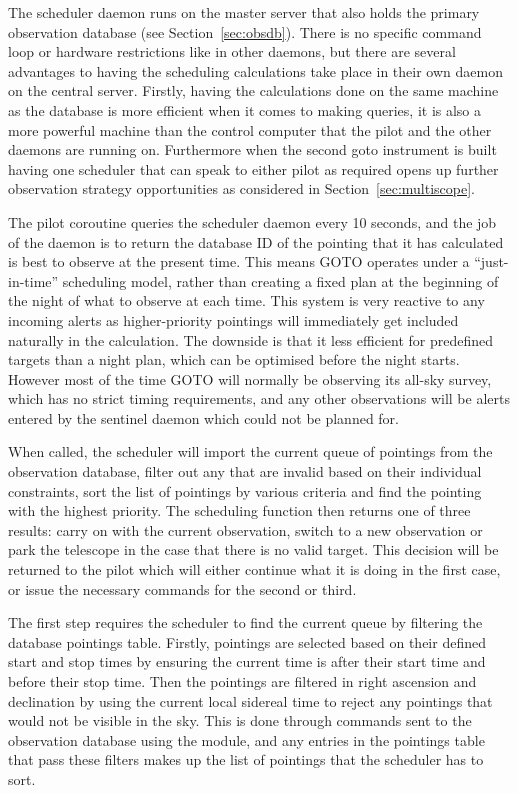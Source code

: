 \begin{colsection}
\begin{colsection}
The scheduler daemon runs on the master server that also holds the primary observation database (see Section~\ref{sec:obsdb}). There is no specific command loop or hardware restrictions like in other daemons, but there are several advantages to having the scheduling calculations take place in their own daemon on the central server. Firstly, having the calculations done on the same machine as the database is more efficient when it comes to making queries, it is also a more powerful machine than the control computer that the pilot and the other daemons are running on. Furthermore when the second \gls{goto} instrument is built having one scheduler that can speak to either pilot as required opens up further observation strategy opportunities as considered in Section~\ref{sec:multiscope}.

The pilot  coroutine queries the scheduler daemon every 10 seconds, and the job of the daemon is to return the database ID of the pointing that it has calculated is best to observe at the present time. This means GOTO operates under a ``just-in-time'' scheduling model, rather than creating a fixed plan at the beginning of the night of what to observe at each time. This system is very reactive to any incoming alerts as higher-priority pointings will immediately get included naturally in the calculation. The downside is that it less efficient for predefined targets than a night plan, which can be optimised before the night starts. However most of the time GOTO will normally be observing its all-sky survey, which has no strict timing requirements, and any other observations will be alerts entered by the sentinel daemon which could not be planned for.

When called, the scheduler will import the current queue of pointings from the observation database, filter out any that are invalid based on their individual constraints, sort the list of pointings by various criteria and find the pointing with the highest priority. The scheduling function then returns one of three results: carry on with the current observation, switch to a new observation or park the telescope in the case that there is no valid target. This decision will be returned to the pilot which will either continue what it is doing in the first case, or issue the necessary commands for the second or third.

The first step requires the scheduler to find the current queue by filtering the database pointings table. Firstly, pointings are selected based on their defined start and stop times by ensuring the current time is after their start time and before their stop time. Then the pointings are filtered in right ascension and declination by using the current local sidereal time to reject any pointings that would not be visible in the sky. This is done through commands sent to the observation database using the  module, and any entries in the pointings table that pass these filters makes up the list of pointings that the scheduler has to sort.


\end{colsection}
\end{colsection}
